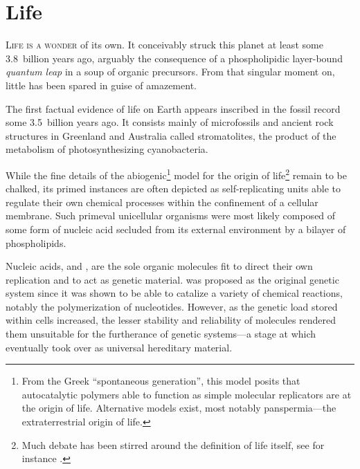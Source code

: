 \documentclass{tufte-book}
\begin{document}
\section{Life}

\textsc{Life is a wonder} of its own.  It conceivably struck this planet at
least some 3.8~billion years ago,\cite{mojzsis_evidence_1996} arguably the
consequence of a phospholipidic \mbox{layer-bound} \emph{quantum leap} in a soup
of organic precursors.\cite{miller_organic_1959} From that singular moment on,
little has been spared in guise of amazement.

\bigskip


The first factual evidence of life on Earth appears inscribed in the fossil
record some 3.5~billion years ago.  It consists mainly of microfossils and
ancient rock structures in Greenland and Australia called
stromatolites,\cite{ohtomo_evidence_2014,noffke_microbially_2013} the product of
the metabolism of photosynthesizing cyanobacteria.

While the fine details of the abiogenic\footnote{From the Greek ``spontaneous
  generation'', this model posits that autocatalytic polymers able to function
  as simple molecular replicators are at the origin of life.  Alternative models
  exist, most notably panspermia---the extraterrestrial origin of life.} model
for the origin of life\footnote{Much debate has been stirred around the
  definition of life itself, see for instance \citealp{benner_defining_2010}.}
remain to be chalked, its primed instances are often depicted as
\mbox{self-replicating} units able to regulate their own chemical processes
within the confinement of a cellular membrane.  Such primeval unicellular
organisms were most likely composed of some form of nucleic acid secluded from
its external environment by a bilayer of phospholipids.

Nucleic acids,  and , are the sole organic
molecules fit to direct their own replication and to act as genetic material.
 was proposed as the original genetic system since it was shown
to be able to catalize a variety of chemical reactions, notably the
polymerization of nucleotides.\cite{bass_specific_1984} However, as the genetic
load stored within cells increased, the lesser stability and reliability of
 molecules rendered them unsuitable for the furtherance of
genetic systems---a stage at which  eventually took over as
universal hereditary material.
\end{document}
